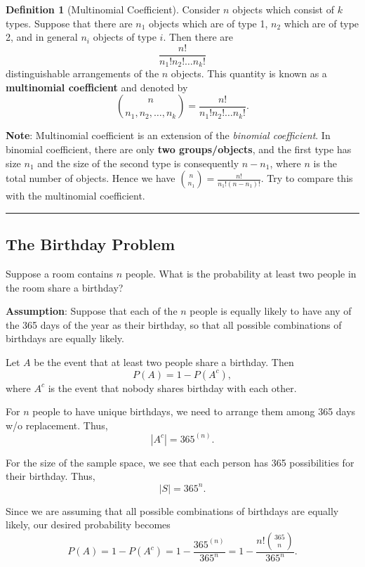 \documentclass[
]{book}
\theoremstyle{definition}
\newtheorem{definition}{Definition}[chapter]
\theoremstyle{definition}
\theoremstyle{definition}
\theoremstyle{definition}
\theoremstyle{remark}
\begin{document}
\begin{definition}[Multinomial Coefficient]
Consider \(n\) objects which consist of \(k\) types. Suppose that there are \(n_1\) objects which are of type 1, \(n_2\) which are of type 2, and in general \(n_i\) objects of type \(i\). Then there are
\[
\frac{n!}{n_1 ! n_2! \dots n_k !}
\]
distinguishable arrangements of the \(n\) objects. This quantity is known as a \textbf{multinomial coefficient} and denoted by
\[
\binom{n}{n_1,n_2,\dots,n_k}= \frac{n !}{n_1 ! n_2! \dots n_k !}.
\]
\end{definition}

\textbf{Note}: Multinomial coefficient is an extension of the \emph{binomial coefficient}. In binomial coefficient, there are only \textbf{two groups/objects}, and the first type has size \(n_1\) and the size of the second type is consequently \(n-n_1\), where \(n\) is the total number of objects. Hence we have \({n \choose n_1} = \frac{n!}{n_1! (n-n_1)!}\). Try to compare this with the multinomial coefficient.

\begin{center}\rule{0.5\linewidth}{0.5pt}\end{center}

\hypertarget{the-birthday-problem}{%
\subsection{The Birthday Problem}\label{the-birthday-problem}}

Suppose a room contains \(n\) people. What is the probability at least two people in the room share a birthday?

\textbf{Assumption}: Suppose that each of the \(n\) people is equally likely to have any of the 365 days of the year as their birthday, so that all possible combinations of birthdays are equally likely.

Let \(A\) be the event that at least two people share a birthday. Then
\[ P(A) = 1 - P(A^c),\]
where \(A^c\) is the event that nobody shares birthday with each other.

For \(n\) people to have unique birthdays, we need to arrange them among 365 days w/o replacement. Thus,
\[|A^c| = 365^{(n)}.\]

For the size of the sample space, we see that each person has 365 possibilities for their birthday. Thus,
\[|S| = 365^n.\]

Since we are assuming that all possible combinations of birthdays are equally likely, our desired probability becomes
\[
P(A) = 1 - P(A^c) = 1 - \frac{365^{(n)}}{365^n} = 1 - \frac{n! {365 \choose n}}{365^n}.
\]
\end{document}
